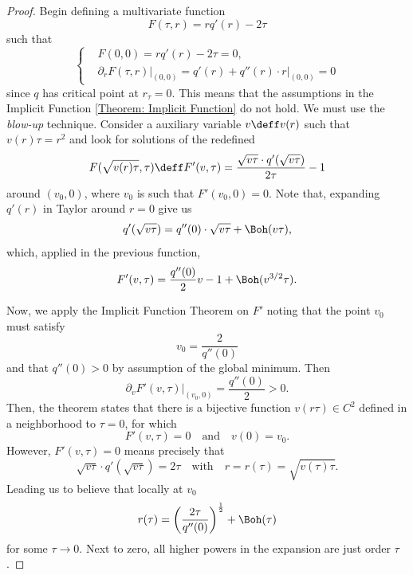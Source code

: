 \begin{proof}
	Begin defining a multivariate function 
	\begin{equation}
		F(\tau, r) = r q'(r) - 2 \tau
	\end{equation}
	such that 
	\begin{equation}
		\begin{cases}
			&F(0, 0) = r q'(r) - 2 \tau =  0, \\
			&\partial_r F(\tau, r) \big|_{(0, 0)} = q'(r) + q''(r) \cdot r \big|_{(0, 0)} = 0
		\end{cases}
	\end{equation}
	since $q$ has critical point at $r_\tau = 0$. This means that the assumptions in the Implicit Function \autoref{Theorem: Implicit Function} do not hold. We must use the \textit{blow-up} technique. Consider a auxiliary variable $v \deff v(r)$ such that $v(r) \tau = r^2 $ and look for solutions of the redefined
	\begin{equation}
		F(\sqrt{v(r) \tau}, \tau) \deff F'(v, \tau) = \frac{\sqrt{v \tau} \cdot q'(\sqrt{v \tau})}{2 \tau} - 1
	\end{equation}
	around $(v_0, 0)$, where $v_0$ is such that $F'(v_0, 0) = 0$. Note that, expanding $q'(r)$ in Taylor around $r=0$ give us
	\begin{equation}
		q'(\sqrt{v \tau}) = q''(0) \cdot \sqrt{v \tau} + \Boh(v \tau),
	\end{equation}
	which, applied in the previous function, 
	\begin{equation}
		F'(v, \tau) = \frac{q''(0)}{2} v - 1 + \Boh(v^{3/2} \tau).
	\end{equation}
	
	Now, we apply the  Implicit Function Theorem on $F'$ noting that the point $v_0$ must satisfy
	\begin{equation}
		v_0 = \frac{2}{q''(0)}
	\end{equation} 
	and that $q''(0) > 0$ by assumption of the global minimum. Then 
	\begin{equation}
		\partial_v F'(v, \tau) \big|_{(v_0, 0)} = \frac{q''(0)}{2} > 0.
	\end{equation}
	 Then, the theorem states that there is a bijective function $v(r\tau) \in C^2$ defined in a neighborhood to $\tau = 0$, for which
	 \begin{equation}
	 	F'(v, \tau) = 0 \quad \text{and} \quad v(0) = v_0.
	 \end{equation}
	 However, $F'(v, \tau) = 0$ means precisely that
	 \begin{equation}
	 	\sqrt{v \tau} \cdot q'(\sqrt{v \tau}) = 2\tau \quad \text{with} \quad r = r(\tau) = \sqrt{v(\tau) \tau}.
	 \end{equation}
	Leading us to believe that locally at $v_0$
	\begin{equation}
		r(\tau) = \left( \frac{2\tau}{q''(0)} \right)^{\frac{1}{2}} + \Boh(\tau)
	\end{equation}
	for some $\tau \rightarrow 0$. Next to zero, all higher powers in the expansion are just order $\tau$.
\end{proof}

